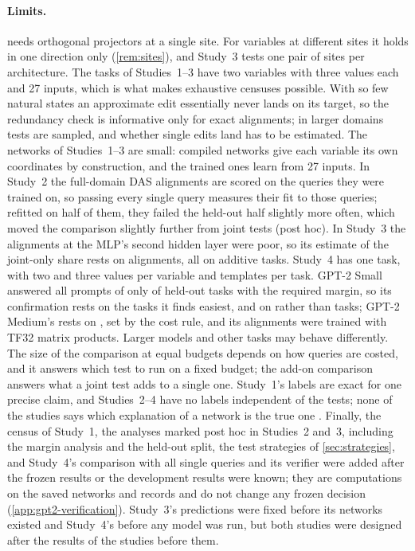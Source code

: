 \paragraph{Limits.}
 needs orthogonal projectors at a single site. For variables at different sites it holds in
one direction only (\cref{rem:sites}), and Study~3 tests one pair of sites per architecture. The tasks of Studies~1--3
have two variables with three values each and 27 inputs, which is what makes exhaustive censuses possible. With so few
natural states an approximate edit essentially never lands on its target, so the redundancy check is informative only
for exact alignments; in larger domains tests are sampled, and whether single edits land has to be estimated. The
networks of Studies~1--3 are small: compiled networks give each variable its own coordinates by construction, and the
trained ones learn from 27 inputs. In Study~2 the full-domain DAS alignments are scored on the queries they were
trained on, so passing every single query measures their fit to those queries; refitted on half of them, they failed
the held-out half slightly more often, which moved the comparison slightly further from joint tests (post hoc). In
Study~3 the alignments at the MLP's second hidden layer were poor, so its estimate of the joint-only share rests on
\MsPerfect{} alignments, all on additive tasks. Study~4 has one task, with two and three values per variable and
\NTemplates{} templates per task. GPT-2 Small answered all \NPrompts{} prompts of only \GatePassedSmall{} of
\GateDrawnSmall{} held-out tasks with the required margin, so its confirmation rests on the tasks it finds easiest, and
on \GatePassedSmall{} rather than \NTasksConf{} tasks; GPT-2 Medium's rests on \NTasksMedium{}, set by the cost rule,
and its alignments were trained with TF32 matrix products. Larger models and other tasks may behave differently. The
size of the comparison at equal budgets depends on how queries are costed, and it answers which test to run on a fixed
budget; the add-on comparison answers what a joint test adds to a single one. Study~1's labels are exact for one
precise claim, and Studies~2--4 have no labels independent of the tests; none of the studies says which explanation
of a network is the true one \citep{meloux2025identifiable,chen2026rome}. Finally, the census of Study~1, the analyses
marked post hoc in Studies~2 and~3, including the margin analysis and the held-out split, the test strategies of
\cref{sec:strategies}, and Study~4's comparison with all single queries and its verifier were added after the frozen
results or the development results were known; they are computations on the saved networks and records and do not
change any frozen decision (\cref{app:gpt2-verification}). Study~3's predictions were fixed before its networks
existed and Study~4's before any model was run, but both studies were designed after the results of the studies before
them.
